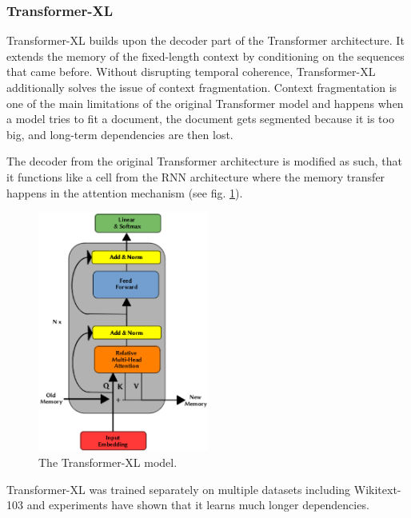 \subsubsection{Transformer-XL}
Transformer-XL \cite{transformer-xl} builds upon the decoder part of the Transformer architecture. It extends the memory of the fixed-length context by conditioning on the sequences that came before. Without disrupting temporal coherence, Transformer-XL additionally solves the issue of context fragmentation. Context fragmentation is one of the main limitations of the original Transformer model and happens when a model tries to fit a document, the document gets segmented because it is too big, and long-term dependencies are then lost. 

The decoder from the original Transformer architecture is modified as such, that it functions like a cell from the RNN architecture where the memory transfer happens in the attention mechanism (see fig. \ref{fig:transformer-xl-arch}).
\begin{figure}[H]
    \centering
    \includegraphics[width=0.5\textwidth]{figures/transformer-xl-arch}
    \caption{The Transformer-XL model. \cite{dowdell2020language}}
    \label{fig:transformer-xl-arch}
\end{figure}
Transformer-XL was trained separately on multiple datasets including Wikitext-103 and experiments have shown that it learns much longer dependencies.

